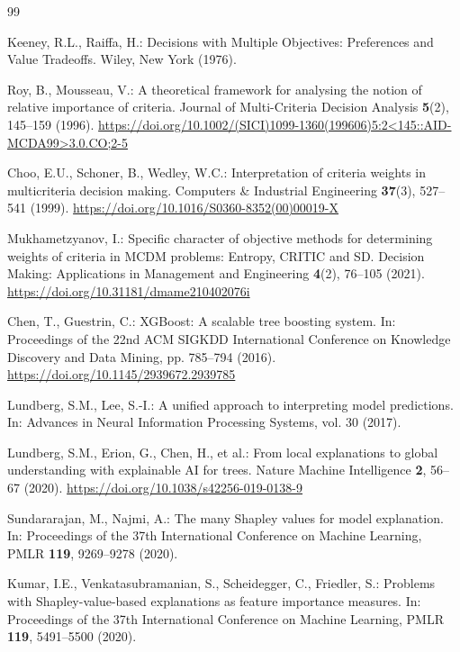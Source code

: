 \documentclass[runningheads,orivec]{llncs}
\begin{document}
\begin{thebibliography}{99}

Keeney, R.L., Raiffa, H.:
Decisions with Multiple Objectives: Preferences and Value Tradeoffs.
Wiley, New York (1976).

Roy, B., Mousseau, V.:
A theoretical framework for analysing the notion of relative importance of criteria.
Journal of Multi-Criteria Decision Analysis \textbf{5}(2), 145--159 (1996).
\url{https://doi.org/10.1002/(SICI)1099-1360(199606)5:2<145::AID-MCDA99>3.0.CO;2-5}

Choo, E.U., Schoner, B., Wedley, W.C.:
Interpretation of criteria weights in multicriteria decision making.
Computers \& Industrial Engineering \textbf{37}(3), 527--541 (1999).
\url{https://doi.org/10.1016/S0360-8352(00)00019-X}

Mukhametzyanov, I.:
Specific character of objective methods for determining weights of criteria in MCDM
problems: Entropy, CRITIC and SD.
Decision Making: Applications in Management and Engineering \textbf{4}(2), 76--105
(2021).
\url{https://doi.org/10.31181/dmame210402076i}

Chen, T., Guestrin, C.:
XGBoost: A scalable tree boosting system.
In: Proceedings of the 22nd ACM SIGKDD International Conference on Knowledge Discovery
and Data Mining, pp. 785--794 (2016).
\url{https://doi.org/10.1145/2939672.2939785}

Lundberg, S.M., Lee, S.-I.:
A unified approach to interpreting model predictions.
In: Advances in Neural Information Processing Systems, vol. 30 (2017).

Lundberg, S.M., Erion, G., Chen, H., et al.:
From local explanations to global understanding with explainable AI for trees.
Nature Machine Intelligence \textbf{2}, 56--67 (2020).
\url{https://doi.org/10.1038/s42256-019-0138-9}

Sundararajan, M., Najmi, A.:
The many Shapley values for model explanation.
In: Proceedings of the 37th International Conference on Machine Learning,
PMLR \textbf{119}, 9269--9278 (2020).

Kumar, I.E., Venkatasubramanian, S., Scheidegger, C., Friedler, S.:
Problems with Shapley-value-based explanations as feature importance measures.
In: Proceedings of the 37th International Conference on Machine Learning,
PMLR \textbf{119}, 5491--5500 (2020).


\end{thebibliography}
\end{document}
